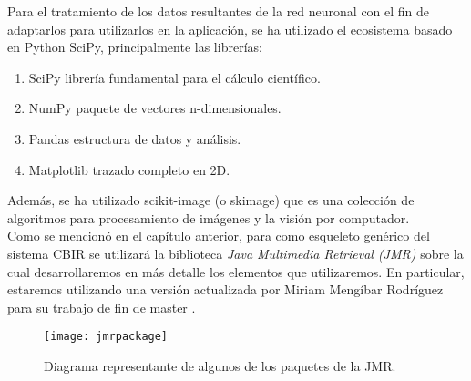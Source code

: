 Para el tratamiento de los datos resultantes de la red neuronal con el fin de adaptarlos para utilizarlos en la aplicación, se ha utilizado el ecosistema basado en Python SciPy, principalmente las librerías:
\begin{enumerate}
\item SciPy \cite{2020SciPy-NMeth} librería fundamental para el cálculo científico.
\item NumPy \cite{2020NumPy-Array} paquete de vectores n-dimensionales.
\item Pandas \cite{reback2020pandas} \cite{mckinney-proc-scipy-2010} estructura de datos y análisis.
\item Matplotlib \cite{Hunter:2007} trazado completo en 2D.
\end{enumerate}
Además, se ha utilizado scikit-image \cite{scikit-image} (o skimage) que es una colección de algoritmos para procesamiento de imágenes y la visión por computador.\\

Como se mencionó en el capítulo anterior, para como esqueleto genérico del sistema CBIR se utilizará la biblioteca \emph{Java Multimedia Retrieval (JMR)} \cite{JMR} sobre la cual desarrollaremos en más detalle los elementos que utilizaremos. En particular, estaremos utilizando una versión actualizada por Miriam Mengíbar Rodríguez para su trabajo de fin de master \cite{TFM}.\\

\begin{figure}[htpb]
  \centering
  \texttt{[image: jmrpackage]}
  \caption{Diagrama representante de algunos de los paquetes de la JMR. \cite{JMR}}
  \label{fig:jmrpackage}
\end{figure}

